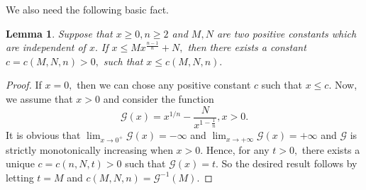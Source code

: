 \documentclass[11pt,twoside]{article}
\newtheorem{lem}[thm]{Lemma}
\theoremstyle{definition}
\theoremstyle{remark}
\begin{document}
We also need the following basic fact. 
\begin{lem}\label{shksujcfdihikd}
Suppose that  $x\geq0, n\geq2$ and $M,N$ are two positive constants which are independent of $x.$  If  $x\leq Mx^{\frac{n-1}{n}}+N,$ then there exists a constant $c=c(M,N,n)>0,$ such that $x\leq c(M,N,n).$
\end{lem}
\begin{proof}
If $x=0,$ then we can chose any positive constant $c$ such that $x\leq c.$ Now, we assume that $x>0$ and consider the function $$\mathcal{G}(x)=x^{1/n}-\frac{N}{x^{1-\frac{1}{n}}},x>0.$$
It is obvious that $\lim_{x\rightarrow0^{+}}\mathcal{G}(x)=-\infty$ and $\lim_{x\rightarrow+\infty}\mathcal{G}(x)=+\infty$ and $\mathcal{G}$ is strictly monotonically increasing when $x>0.$ Hence, for any $t>0,$ there exists 
a unique $c=c(n,N,t)>0$ such that $\mathcal{G}(x)=t.$ So the desired result follows by letting $t=M$ and $c(M,N,n)=\mathcal{G}^{-1}(M).$
\end{proof}
\end{document}
